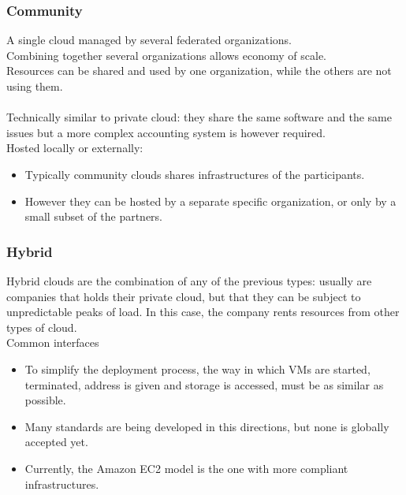 \documentclass[10pt, oneside]{article}
\begin{document}
\subsubsection{Community}
A single cloud managed by several federated organizations.\\Combining together several organizations allows economy of scale.\\Resources can be shared and used by one organization, while the others are not using them.\\\\Technically similar to private cloud: they share the same software and the same issues but a more complex accounting system is however required.\\Hosted locally or externally:\begin{itemize}
    \item Typically community clouds shares infrastructures of the participants.
    \item However they can be hosted by a separate specific organization, or only by a small subset of the partners.
\end{itemize}

\subsubsection{Hybrid}
Hybrid clouds are the combination of any of the previous types: usually are companies that holds their private cloud, but that they can be subject to unpredictable peaks of load. In this case, the company rents resources from other types of cloud.\\Common interfaces\begin{itemize}
    \item To simplify the deployment process, the way in which VMs are started, terminated, address is given and storage is accessed, must be as similar as possible.
    \item Many standards are being developed in this directions, but none is globally accepted yet.
    \item Currently, the Amazon EC2 model is the one with more compliant infrastructures.
\end{itemize}
\end{document}
